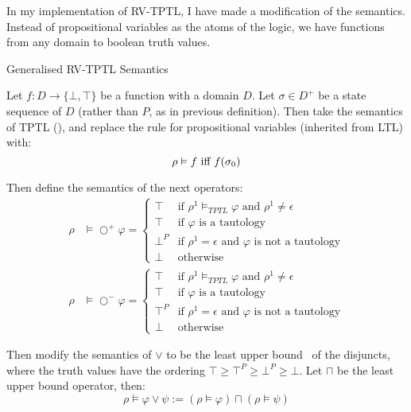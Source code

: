 \documentclass[a4paper]{article}
\newcommand{\tand}{\text{ and }}
\newcommand{\tor}{\text{ or }}
\newcommand{\tiff}{\text{ iff }}
\newcommand{\sn}{\bigcirc^+}
\newcommand{\wn}{\bigcirc^-}
\begin{document}
In my implementation of RV-TPTL, I have made a modification of the semantics. Instead of propositional variables as the atoms of the logic, we have functions from any domain to boolean truth values.

\begin{defn}{Generalised RV-TPTL Semantics}

  Let $f:D\to\{\bot,\top\}$ be a function with a domain $D$. Let $\sigma\in D^+$ be a state sequence of $D$ (rather than $P$, as in previous definition). Then take the semantics of TPTL (), and replace the rule for propositional variables (inherited from LTL) with:
  \[ \rho \vDash f \tiff f(\sigma_0)\\ \]

  Then define the semantics of the next operators:
  \begin{align*}
    \rho&\vDash\sn\varphi =
    \begin{cases}
      \top &\text{if } \rho^1\vDash_{TPTL}\varphi \tand \rho^1 \neq \epsilon\\
      \top &\text{if } \varphi \text{ is a tautology}\\
      \bot^P &\text{if } \rho^1 = \epsilon \tand \varphi \text{ is not a tautology}\\
      \bot &\text{otherwise}
    \end{cases}\\
    \rho&\vDash\wn\varphi =
    \begin{cases}
      \top &\text{if } \rho^1\vDash_{TPTL}\varphi \tand \rho^1 \neq \epsilon\\
      \top &\text{if } \varphi \text{ is a tautology}\\
      \top^P &\text{if } \rho^1 = \epsilon \tand \varphi \text{ is not a tautology}\\
      \bot &\text{otherwise}
    \end{cases}
  \end{align*}

  Then modify the semantics of $\lor$ to be the least upper bound~\autocite[654]{bauer2010comparing} of the disjuncts, where the truth values have the ordering \(\top\geq\top^P\geq\bot^P\geq\bot\). Let $\sqcap$ be the least upper bound operator, then:
  \[\rho\vDash\varphi\lor\psi := (\rho\vDash\varphi) \sqcap (\rho\vDash\psi)\]

\end{defn}
\end{document}
